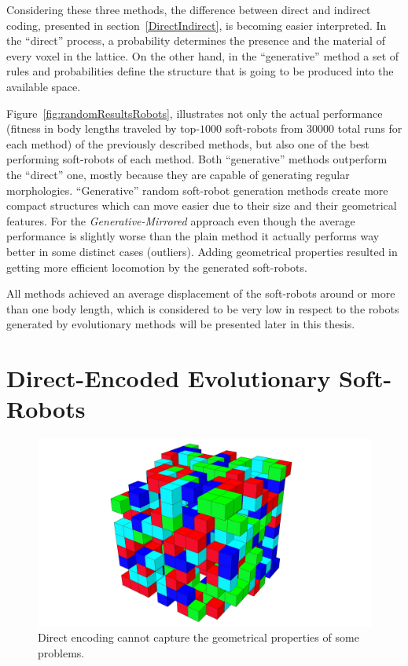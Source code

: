 Considering these three methods, the difference between direct and indirect coding, presented in section~\ref{DirectIndirect}, is becoming easier interpreted. In the ``direct'' process, a probability determines the presence and the material of every voxel in the lattice. On the other hand, in the ``generative'' method a set of rules and probabilities define the structure that is going to be produced into the available space.

Figure~\ref{fig:randomResultsRobots}, illustrates not only the actual performance (fitness in body lengths traveled by top-$1000$ soft-robots from $30000$ total runs for each method) of the previously described methods, but also one of the best performing soft-robots of each method. Both ``generative'' methods outperform the ``direct'' one, mostly because they are capable of generating regular morphologies. ``Generative'' random soft-robot generation methods create more compact structures which can move easier due to their size and their geometrical features. For the \textit{Generative-Mirrored} approach even though the average performance is slightly worse than the plain method it actually performs way better in some distinct cases (outliers). Adding geometrical properties resulted in getting more efficient locomotion by the generated soft-robots.

All methods achieved an average displacement of the soft-robots around or more than one body length, which is considered to be very low in respect to the robots generated by evolutionary methods will be presented later in this thesis.

\section{Direct-Encoded Evolutionary Soft-Robots}
\label{DirectEncodingEvolution}

\begin{figure}
\centering
\includegraphics[height=0.2\textheight]{../Figures/Robots/direct.jpg}
\caption{Direct encoding cannot capture the geometrical properties of some problems.}
\label{fig:directRobot}
\end{figure}

